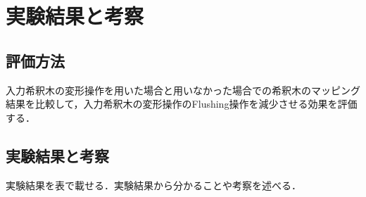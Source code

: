 \chapter{実験結果と考察}
\section{評価方法}
入力希釈木の変形操作を用いた場合と用いなかった場合での希釈木のマッピング結果を比較して，入力希釈木の変形操作のFlushing操作を減少させる効果を評価する．
\section{実験結果と考察}
実験結果を表で載せる．実験結果から分かることや考察を述べる．
